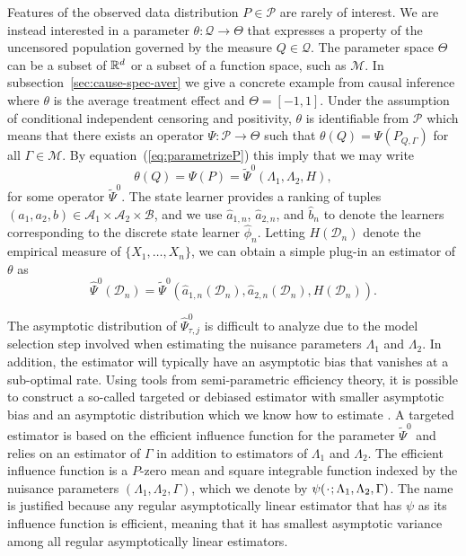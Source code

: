 \documentclass[a4,danish]{article}
\newcommand{\data}{\ensuremath{\mathcal{D}}}
\begin{document}
Features of the observed data distribution \( P \in \mathcal{P} \) are rarely of
interest. We are instead interested in a parameter
\( \theta \colon \mathcal{Q} \rightarrow \Theta \) that expresses a property of
the uncensored population governed by the measure \( Q \in \mathcal{Q} \). The
parameter space $\Theta$ can be a subset of \(\mathbb{R}^d\) or a subset of a function
space, such as \(\mathcal{M}\). In subsection~\ref{sec:cause-spec-aver} we give
a concrete example from causal inference where $\theta$ is the average treatment
effect and \( \Theta = [-1,1] \). Under the assumption of conditional
independent censoring and positivity, $\theta$ is identifiable from
\( \mathcal{P} \) which means that there exists an operator
\( \Psi \colon \mathcal{P} \rightarrow \Theta \) such that
\( \theta(Q) = \Psi(P_{Q, \Gamma}) \) for all $\Gamma \in \mathcal{M}$. By
equation~(\ref{eq:parametrizeP}) this imply that we may write
\begin{equation*}
  \theta(Q) = \Psi(P) = \tilde{\Psi}^0(\Lambda_1, \Lambda_2, H),
\end{equation*}
for some operator \( \tilde{\Psi}^0 \). The state learner provides a ranking of
tuples
\( (a_1, a_2, b) \in \mathcal{A}_1 \times \mathcal{A}_2 \times \mathcal{B} \),
and we use \( \hat{a}_{1,n} \), \( \hat{a}_{2,n} \), and \( \hat{b}_n \) to
denote the learners corresponding to the discrete state learner
\( \hat{\phi}_n \). Letting \( H(\data_n) \) denote the empirical measure of
\( \{X_1, \dots, X_n\} \), we can obtain a simple plug-in an estimator of
$\theta$ as
\begin{equation}
  \label{eq:2}
  \hat{\Psi}^0(\data_n) =
  \tilde{\Psi}^0(\hat{a}_{1,n}(\data_n), \hat{a}_{2,n}(\data_n), H(\data_n)). 
\end{equation}

The asymptotic distribution of \( \hat{\Psi}_{\tau, j}^0 \) is difficult to
analyze due to the model selection step involved when estimating the nuisance
parameters $\Lambda_1$ and $\Lambda_2$. In addition, the estimator will
typically have an asymptotic bias that vanishes at a sub-optimal rate. Using
tools from semi-parametric efficiency theory, it is possible to construct a
so-called targeted or debiased estimator with smaller asymptotic bias and an
asymptotic distribution which we know how to estimate
\citep{bickel1993efficient,van2011targeted,chernozhukov2018double}. A targeted
estimator is based on the efficient influence function for the parameter
$\tilde{\Psi}^0$ and relies on an estimator of $\Gamma$ in addition to
estimators of \( \Lambda_1 \) and $\Lambda_2$. The efficient influence function
is a \( P \)-zero mean and square integrable function indexed by the nuisance
parameters \( (\Lambda_1, \Lambda_2, \Gamma) \), which we denote by
\( \psi(\blank ; \Lambda_1, \Lambda_2, \Gamma) \). The name is justified because
any regular asymptotically linear estimator that has \( \psi \) as its influence
function is efficient, meaning that it has smallest asymptotic variance among
all regular asymptotically linear estimators.
\end{document}
